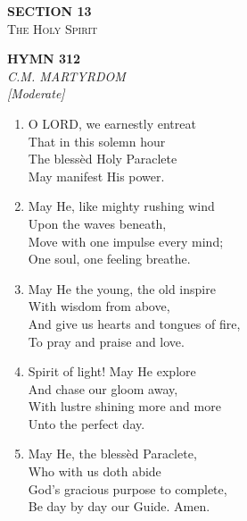 \newpage
\thispagestyle{empty}
\vspace*{3.5cm}
\begin{center}
    {\LARGE \textbf{SECTION 13}}\\[0.8em]
    {\Large \textsc{The Holy Spirit}}
\end{center}
\vspace{3.5cm}

\newpage
\begin{center}
    {\Large \textbf{HYMN 312}}
    \\
    \textit{C.M. MARTYRDOM}
    \\
    \textit{\small [Moderate]}
\end{center}
\vspace{1em}

\begin{enumerate}
    \item O LORD, we earnestly entreat \\
        That in this solemn hour \\
        The bless\`ed Holy Paraclete \\
        May manifest His power.

    \item May He, like mighty rushing wind \\
        Upon the waves beneath, \\
        Move with one impulse every mind; \\
        One soul, one feeling breathe.

    \item May He the young, the old inspire \\
        With wisdom from above, \\
        And give us hearts and tongues of fire, \\
        To pray and praise and love.

    \item Spirit of light! May He explore \\
        And chase our gloom away, \\
        With lustre shining more and more \\
        Unto the perfect day.

    \item May He, the bless\`ed Paraclete, \\
        Who with us doth abide \\
        God's gracious purpose to complete, \\
        Be day by day our Guide. Amen.

\end{enumerate}

